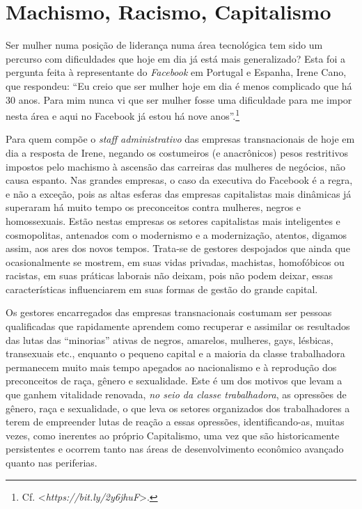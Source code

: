 \chapter{Machismo, Racismo, Capitalismo}

Ser mulher numa posição de liderança numa área tecnológica tem sido um
percurso com dificuldades que hoje em dia já está mais generalizado?
Esta foi a pergunta feita à representante do \emph{Facebook} em Portugal
e Espanha, Irene Cano, que respondeu: ``Eu creio que ser mulher hoje em
dia é menos complicado que há 30 anos. Para mim nunca vi que ser mulher
fosse uma dificuldade para me impor nesta área e aqui no Facebook já
estou há nove anos''.\footnote{Cf. \textless{}\emph{https://bit.ly/2y6jhuF}\textgreater{}.}

Para quem compõe o \emph{staff administrativo} das empresas
transnacionais de hoje em dia a resposta de Irene, negando os
costumeiros (e anacrônicos) pesos restritivos impostos pelo machismo à
ascensão das carreiras das mulheres de negócios, não causa espanto. Nas
grandes empresas, o caso da executiva do Facebook é a regra, e não a
exceção, pois as altas esferas das empresas capitalistas mais dinâmicas
já superaram há muito tempo os preconceitos contra mulheres, negros e
homossexuais. Estão nestas empresas os setores capitalistas mais
inteligentes e cosmopolitas, antenados com o modernismo e a
modernização, atentos, digamos assim, aos ares dos novos tempos.
Trata-se de gestores despojados que ainda que ocasionalmente se mostrem,
em suas vidas privadas, machistas, homofóbicos ou racistas, em suas
práticas laborais não deixam, pois não podem deixar, essas
características influenciarem em suas formas de gestão do grande
capital.

Os gestores encarregados das empresas transnacionais costumam ser
pessoas qualificadas que rapidamente aprendem como recuperar e assimilar
os resultados das lutas das ``minorias'' ativas de negros, amarelos,
mulheres, gays, lésbicas, transexuais etc., enquanto o pequeno capital e
a maioria da classe trabalhadora permanecem muito mais tempo apegados ao
nacionalismo e à reprodução dos preconceitos de raça, gênero e
sexualidade. Este é um dos motivos que levam a que ganhem vitalidade
renovada, \emph{no seio da classe trabalhadora}, as opressões de gênero,
raça e sexualidade, o que leva os setores organizados dos trabalhadores
a terem de empreender lutas de reação a essas opressões,
identificando-as, muitas vezes, como inerentes ao próprio Capitalismo,
uma vez que são historicamente persistentes e ocorrem tanto nas áreas de
desenvolvimento econômico avançado quanto nas periferias.

